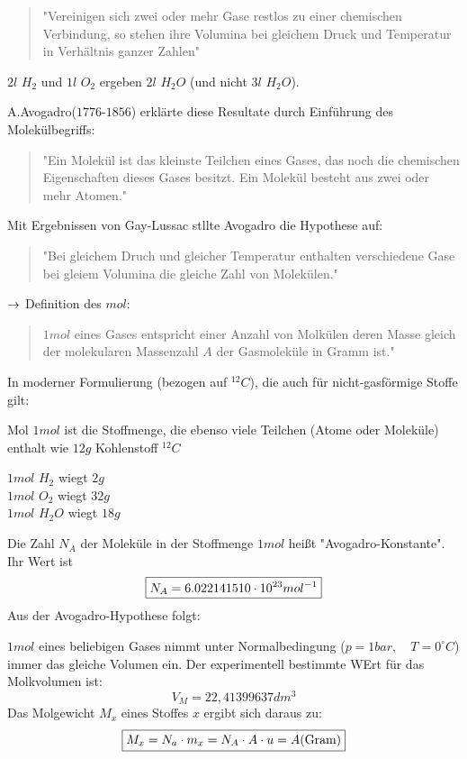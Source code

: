 \begin{quote}
"Vereinigen sich zwei oder mehr Gase restlos zu einer chemischen Verbindung, so
stehen ihre Volumina bei gleichem Druck und Temperatur in Verhältnis ganzer
Zahlen"
\end{quote}
\begin{beis}
    $2l$ $H_2$ und $1l$ $O_2$ ergeben $2l$ $H_2O$ (und nicht $3l$ $H_2O$).
\end{beis}
A.Avogadro($1776$-$1856$) erklärte diese Resultate durch Einführung des
Molekülbegriffs:
\begin{quote}
    "Ein Molekül ist das kleinste Teilchen eines Gases, das noch die chemischen
    Eigenschaften dieses Gases besitzt. Ein Molekül besteht aus zwei oder mehr Atomen."
\end{quote}
Mit Ergebnissen von Gay-Lussac stllte Avogadro die Hypothese auf:
\begin{quote}
    "Bei gleichem Druch und gleicher Temperatur enthalten verschiedene Gase bei
    gleiem Volumina die gleiche Zahl von Molekülen."
\end{quote}
$\rightarrow$ Definition des $mol$:
\begin{quote}
    $1 mol$ eines Gases entspricht einer Anzahl von Molkülen deren Masse gleich
    der molekularen Massenzahl $A$ der Gasmoleküle in Gramm ist."
\end{quote}
In moderner Formulierung (bezogen auf $^{12}C$), die auch für nicht-gasförmige
Stoffe gilt: 
\begin{erl}{Mol}
    $1mol$ ist die Stoffmenge, die ebenso viele Teilchen (Atome oder Moleküle)
    enthalt wie $12g$ Kohlenstoff $^{12}C$
\end{erl}
\begin{beis}
    $1mol$ $H_2$ wiegt $2g$ \\
    $1mol$ $O_2$ wiegt $32g$ \\
    $1mol$ $H_2O$ wiegt $18g$ 
\end{beis}
Die Zahl $N_A$ der Moleküle in der Stoffmenge $1mol$ heißt
"Avogadro-Konstante". Ihr Wert ist
\begin{equation*}
    \boxed{
    N_A = 6.022141510 \cdot 10^{23} mol^{-1}
    }
\end{equation*}
Aus der Avogadro-Hypothese folgt:

$1mol$ eines beliebigen Gases nimmt unter Normalbedingung ($p=1bar, \quad
T=0^{\circ}C$) immer das gleiche Volumen ein. Der experimentell bestimmte WErt
für das Molkvolumen ist:
\begin{equation*}
    \boxed{
        V_M=22,41399637 dm^3
    }
\end{equation*}
Das Molgewicht $M_x$ eines Stoffes $x$ ergibt sich daraus zu:
\begin{equation*}
    \boxed{
        M_x = N_a \cdot m_x = N_A \cdot A \cdot u = A\text{(Gram)}
    }
\end{equation*}
